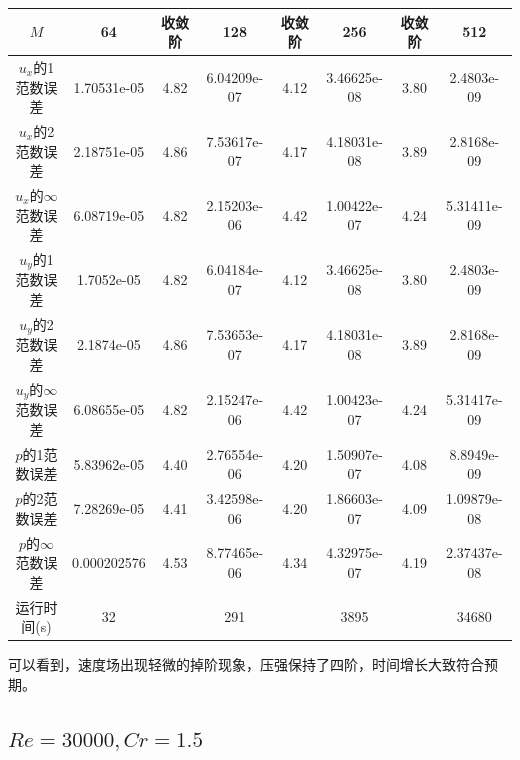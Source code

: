 \documentclass[lang=cn,10pt,bibend=bibtex]{elegantbook}
\begin{document}
\begin{table}[H]
  \centering
  \small
  \begin{tabular}{c|ccccccc}
  \textbf{$M$}              & 64          & 收敛阶 & 128         & 收敛阶 & 256         & 收敛阶 & 512   \\ \hline
  $u_x$的1范数误差 & 1.70531e-05 & 4.82 & 6.04209e-07 & 4.12 & 3.46625e-08 & 3.80 & 2.4803e-09\\
  $u_x$的2范数误差 & 2.18751e-05 & 4.86 & 7.53617e-07 & 4.17 & 4.18031e-08 & 3.89 & 2.8168e-09\\
  $u_x$的$\infty$范数误差 & 6.08719e-05 & 4.82 & 2.15203e-06 & 4.42 & 1.00422e-07 & 4.24 & 5.31411e-09\\
  $u_y$的1范数误差 & 1.7052e-05 & 4.82 & 6.04184e-07 & 4.12 & 3.46625e-08 & 3.80 & 2.4803e-09\\
  $u_y$的2范数误差 & 2.1874e-05 & 4.86 & 7.53653e-07 & 4.17 & 4.18031e-08 & 3.89 & 2.8168e-09\\
  $u_y$的$\infty$范数误差 & 6.08655e-05 & 4.82 & 2.15247e-06 & 4.42 & 1.00423e-07 & 4.24 & 5.31417e-09\\
  $p$的1范数误差 & 5.83962e-05 & 4.40 & 2.76554e-06 & 4.20 & 1.50907e-07 & 4.08 & 8.8949e-09\\
  $p$的2范数误差 & 7.28269e-05 & 4.41 & 3.42598e-06 & 4.20 & 1.86603e-07 & 4.09 & 1.09879e-08\\
  $p$的$\infty$范数误差 & 0.000202576 & 4.53 & 8.77465e-06 & 4.34 & 4.32975e-07 & 4.19 & 2.37437e-08\\  
  运行时间(s)                &      32      &       &     291      &       &     3895     &       &  34680
  \end{tabular}
\end{table}

可以看到，速度场出现轻微的掉阶现象，压强保持了四阶，时间增长大致符合预期。

\subsection{$Re=30000,Cr=1.5$}
\end{document}
